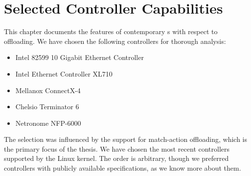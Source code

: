 \chapter{Selected Controller Capabilities}
\label{chap:nics}

This chapter documents the features of contemporary s with respect to
offloading. We have chosen the following controllers for thorough analysis:

\begin{itemize}
	\item Intel 82599 10 Gigabit Ethernet Controller
	\item Intel Ethernet Controller XL710
	\item Mellanox ConnectX-4
	\item Chelsio Terminator 6
	\item Netronome NFP-6000
\end{itemize}

The selection was influenced by the support for match-action offloading, which is the
primary focus of the thesis. We have chosen the most recent controllers
supported by the Linux kernel. The order is arbitrary, though we preferred
controllers with publicly available specifications, as we know more about them.


\newcommand{\sect}[1]{}






